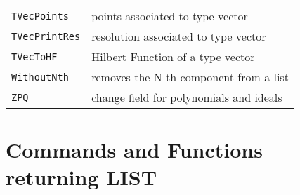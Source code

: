 \documentclass[a4paper]{mybook}
\begin{document}
\begin{center}
\begin{longtable}{ll}
{\verb~TVecPoints~} &
      points associated to type vector\\
   
{\verb~TVecPrintRes~} &
      resolution associated to type vector\\
   
{\verb~TVecToHF~} &
      Hilbert Function of a type vector\\
   
{\verb~WithoutNth~} &
      removes the N-th component from a list\\
   
{\verb~ZPQ~} &
      change field for polynomials and ideals\\
   
\end{longtable}
\end{center}

\noindent



\section{Commands and Functions returning LIST}
\label{Commands and Functions returning LIST}

        
\end{document}
